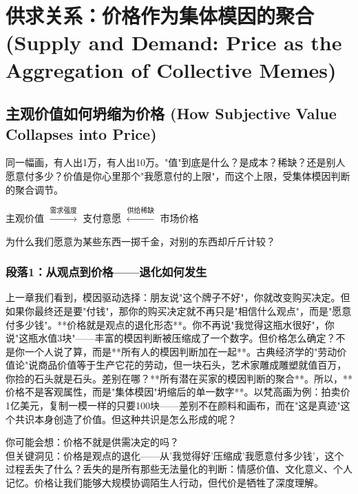 \documentclass[openany, a4paper, 12pt]{book}
\newenvironment{logicmap}{
	\begin{tcolorbox}[
		colback=blue!5!white,      %
		colframe=blue!50!black,    %
		title=\textbf{逻辑地图 (Logic Map)}, %
		fonttitle=\bfseries,
		sharp corners=south,       %
		boxrule=0.5mm
		]
	\centering
	}{
	\end{tcolorbox}
}
\newenvironment{motivation}{
	\vspace{0.5em}
	\begin{tcolorbox}[
		colback=gray!10,           %
		colframe=gray!60,          %
		title=\textit{本章动机 (Motivation)},
		fonttitle=\bfseries,
		arc=0mm,                   %
		leftrule=3mm               %
		]
		\small \itshape %
	}{
	\end{tcolorbox}
	\vspace{1em}
}
\begin{document}
	\section{供求关系：价格作为集体模因的聚合 (Supply and Demand: Price as the Aggregation of Collective Memes)}

	\subsection{主观价值如何坍缩为价格 (How Subjective Value Collapses into Price)}
	\begin{motivation}
		同一幅画，有人出1万，有人出10万。"值"到底是什么？是成本？稀缺？还是别人愿意付多少？价值是你心里那个"我愿意付的上限"，而这个上限，受集体模因判断的聚合调节。
	\end{motivation}
	\begin{logicmap}
		主观价值 $\xrightarrow{\text{需求强度}}$ 支付意愿 $\xleftarrow{\text{供给稀缺}}$ 市场价格
	\end{logicmap}
	\begin{questionbox}
		为什么我们愿意为某些东西一掷千金，对别的东西却斤斤计较？
	\end{questionbox}

	\subsubsection*{段落1：从观点到价格——退化如何发生}
	上一章我们看到，模因驱动选择：朋友说"这个牌子不好"，你就改变购买决定。但如果你最终还是要"付钱"，那你的购买决定就不再只是"相信什么观点"，而是"愿意付多少钱"。**价格就是观点的退化形态**。你不再说"我觉得这瓶水很好"，你说"这瓶水值3块"——丰富的模因判断被压缩成了一个数字。但价格怎么确定？不是你一个人说了算，而是**所有人的模因判断加在一起**。古典经济学的"劳动价值论"说商品价值等于生产它花的劳动，但一块石头，艺术家雕成雕塑就值百万，你捡的石头就是石头。差别在哪？**所有潜在买家的模因判断的聚合**。所以，**价格不是客观属性，而是"集体模因"坍缩后的单一数字**。以梵高画为例：拍卖价1亿美元，复制一模一样的只要100块——差别不在颜料和画布，而在"这是真迹"这个共识本身创造了价值。但这种共识是怎么形成的呢？

	\begin{tcolorbox}[colback=yellow!5, title=\textit{读者行为预测}]
		你可能会想：价格不就是供需决定的吗？\\ 但关键洞见：价格是观点的退化——从'我觉得好'压缩成'我愿意付多少钱'，这个过程丢失了什么？丢失的是所有那些无法量化的判断：情感价值、文化意义、个人记忆。价格让我们能够大规模协调陌生人行动，但代价是牺牲了深度理解。
	\end{tcolorbox}
\end{document}
